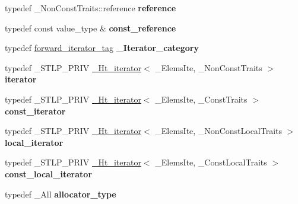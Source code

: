 \begin{DoxyCompactItemize}
\item 
\mbox{\label{classhashtable_a0cb322282042b0ccb701eca74356b5b5}} 
typedef \+\_\+\+Non\+Const\+Traits\+::reference {\bfseries reference}
\item 
\mbox{\label{classhashtable_a268d760af41e8ae91c47fb35767ea073}} 
typedef const value\+\_\+type \& {\bfseries const\+\_\+reference}
\item 
\mbox{\label{classhashtable_aba9537182653333ee3e2f6281a8a2a26}} 
typedef \hyperlink{structforward__iterator__tag}{forward\+\_\+iterator\+\_\+tag} {\bfseries \+\_\+\+Iterator\+\_\+category}
\item 
\mbox{\label{classhashtable_a5ef9060dd0e36af863d09b5c01311ca4}} 
typedef \+\_\+\+S\+T\+L\+P\+\_\+\+P\+R\+IV \hyperlink{struct___ht__iterator}{\+\_\+\+Ht\+\_\+iterator}$<$ \+\_\+\+Elems\+Ite, \+\_\+\+Non\+Const\+Traits $>$ {\bfseries iterator}
\item 
\mbox{\label{classhashtable_a140c50201251523d9a211b173b13680b}} 
typedef \+\_\+\+S\+T\+L\+P\+\_\+\+P\+R\+IV \hyperlink{struct___ht__iterator}{\+\_\+\+Ht\+\_\+iterator}$<$ \+\_\+\+Elems\+Ite, \+\_\+\+Const\+Traits $>$ {\bfseries const\+\_\+iterator}
\item 
\mbox{\label{classhashtable_adcbdbd15789daff0a88fcad6fa4737e8}} 
typedef \+\_\+\+S\+T\+L\+P\+\_\+\+P\+R\+IV \hyperlink{struct___ht__iterator}{\+\_\+\+Ht\+\_\+iterator}$<$ \+\_\+\+Elems\+Ite, \+\_\+\+Non\+Const\+Local\+Traits $>$ {\bfseries local\+\_\+iterator}
\item 
\mbox{\label{classhashtable_ac32e2764bd963018f6143688b3d9da67}} 
typedef \+\_\+\+S\+T\+L\+P\+\_\+\+P\+R\+IV \hyperlink{struct___ht__iterator}{\+\_\+\+Ht\+\_\+iterator}$<$ \+\_\+\+Elems\+Ite, \+\_\+\+Const\+Local\+Traits $>$ {\bfseries const\+\_\+local\+\_\+iterator}
\item 
\mbox{\label{classhashtable_a71c7e8e8a2c291f43242691663379adf}} 
typedef \+\_\+\+All {\bfseries allocator\+\_\+type}
\item 
\mbox{\label{classhashtable_a402f8855090127ba82f6d4b50ed99441}} 

\end{DoxyCompactItemize}
